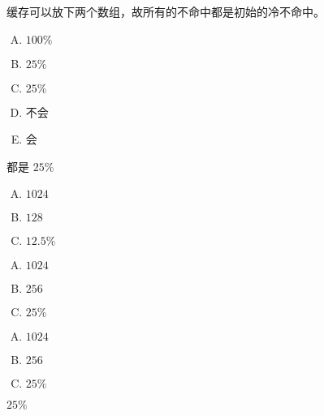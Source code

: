 {    %
    \begin{practicec}
        缓存可以放下两个数组，故所有的不命中都是初始的冷不命中。
    \end{practicec}

    \begin{practicec}
        \begin{enumerate}[A.]
            \item $100\%$
            \item $25\%$
            \item $25\%$
            \item 不会
            \item 会
        \end{enumerate}
    \end{practicec}

    \begin{practicec}
        都是 $25\%$
    \end{practicec}

    \begin{practicec}
        \begin{enumerate}[A.]
            \item $1024$
            \item $128$
            \item $12.5\%$
        \end{enumerate}
    \end{practicec}

    \begin{practicec}
        \begin{enumerate}[A.]
            \item $1024$
            \item $256$
            \item $25\%$
        \end{enumerate}
    \end{practicec}

    \begin{practicec}
        \begin{enumerate}[A.]
            \item $1024$
            \item $256$
            \item $25\%$
        \end{enumerate}
    \end{practicec}

    \begin{practicec}
        $25\%$
    \end{practicec}

}
